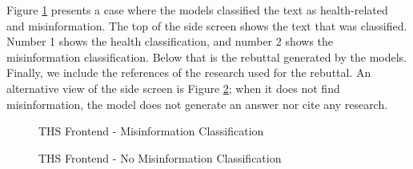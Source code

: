Figure \ref{fig:frontendmisinformation}  presents a case where the models classified the text as health-related and misinformation. The top of the side screen shows the text that was classified. Number 1 shows the health classification, and number 2 shows the misinformation classification. Below that is the rebuttal generated by the models. Finally, we include the references of the research used for the rebuttal. An alternative view of the side screen is Figure \ref{fig:frontendnonmisinformation}; when it does not find misinformation, the model does not generate an answer nor cite any research.

\begin{figure}[H]
\noindent{}%
	\caption{THS Frontend - Misinformation Classification } %
	\label{fig:frontendmisinformation}
\end{figure}


\begin{figure}[H]
\noindent{}%
	\caption{THS Frontend  - No Misinformation Classification} %
	\label{fig:frontendnonmisinformation}
\end{figure}



